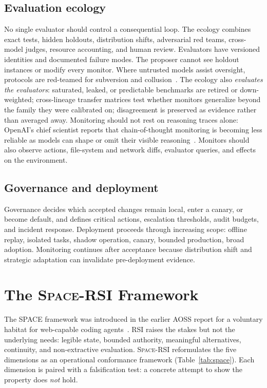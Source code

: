\documentclass[11pt,a4paper]{article}
\newcommand{\SpaceRSI}{\textsc{Space-RSI}}
\begin{document}
\subsection{Evaluation ecology}

No single evaluator should control a consequential loop. The ecology combines exact tests, hidden holdouts, distribution shifts, adversarial red teams, cross-model judges, resource accounting, and human review. Evaluators have versioned identities and documented failure modes. The proposer cannot see holdout instances or modify every monitor. Where untrusted models assist oversight, protocols are red-teamed for subversion and collusion~\cite{aicontrol,kutasov,untrusted-monitoring}. The ecology also \emph{evaluates the evaluators}: saturated, leaked, or predictable benchmarks are retired or down-weighted; cross-lineage transfer matrices test whether monitors generalize beyond the family they were calibrated on; disagreement is preserved as evidence rather than averaged away. Monitoring should not rest on reasoning traces alone: OpenAI's chief scientist reports that chain-of-thought monitoring is becoming less reliable as models can shape or omit their visible reasoning~\cite{pachocki}. Monitors should also observe actions, file-system and network diffs, evaluator queries, and effects on the environment.

\subsection{Governance and deployment}

Governance decides which accepted changes remain local, enter a canary, or become default, and defines critical actions, escalation thresholds, audit budgets, and incident response. Deployment proceeds through increasing scope: offline replay, isolated tasks, shadow operation, canary, bounded production, broad adoption. Monitoring continues after acceptance because distribution shift and strategic adaptation can invalidate pre-deployment evidence.

\section{The \SpaceRSI{} Framework}\label{sec:space}

The SPACE framework was introduced in the earlier AOSS report for a voluntary habitat for web-capable coding agents~\cite{aoss}. RSI raises the stakes but not the underlying needs: legible state, bounded authority, meaningful alternatives, continuity, and non-extractive evaluation. \SpaceRSI{} reformulates the five dimensions as an operational conformance framework (Table~\ref{tab:space}). Each dimension is paired with a falsification test: a concrete attempt to show the property does \emph{not} hold.
\end{document}
